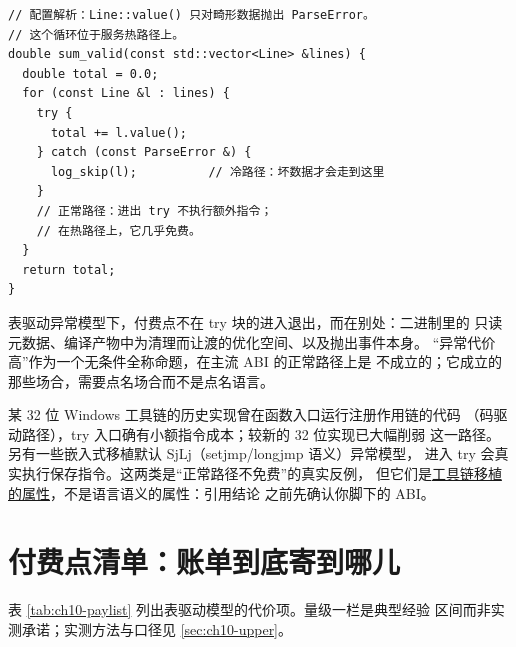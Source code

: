 \documentclass[12pt,a4paper,fontset=fandol]{ctexbook}
\begin{document}
\begin{lstlisting}[style=cppstyle]
// 配置解析：Line::value() 只对畸形数据抛出 ParseError。
// 这个循环位于服务热路径上。
double sum_valid(const std::vector<Line> &lines) {
  double total = 0.0;
  for (const Line &l : lines) {
    try {
      total += l.value();
    } catch (const ParseError &) {
      log_skip(l);          // 冷路径：坏数据才会走到这里
    }
    // 正常路径：进出 try 不执行额外指令；
    // 在热路径上，它几乎免费。
  }
  return total;
}
\end{lstlisting}

\begin{guideline}[title={``零成本抽象''的准确含义}]
表驱动异常模型下，付费点不在 try 块的进入退出，而在别处：二进制里的
只读元数据、编译产物中为清理而让渡的优化空间、以及抛出事件本身。
``异常代价高''作为一个无条件全称命题，在主流 ABI 的正常路径上是
不成立的；它成立的那些场合，需要点名场合而不是点名语言。
\end{guideline}

某 32 位 Windows 工具链的历史实现曾在函数入口运行注册作用链的代码
（码驱动路径），try 入口确有小额指令成本；较新的 32 位实现已大幅削弱
这一路径。另有一些嵌入式移植默认 SjLj（setjmp/longjmp 语义）异常模型，
进入 try 会真实执行保存指令。这两类是``正常路径不免费''的真实反例，
但它们是\underline{工具链移植的属性}，不是语言语义的属性：引用结论
之前先确认你脚下的 ABI。

\section{付费点清单：账单到底寄到哪儿}
\label{sec:ch10-paylist}

表 \ref{tab:ch10-paylist} 列出表驱动模型的代价项。量级一栏是典型经验
区间而非实测承诺；实测方法与口径见 \ref{sec:ch10-upper}。
\end{document}
